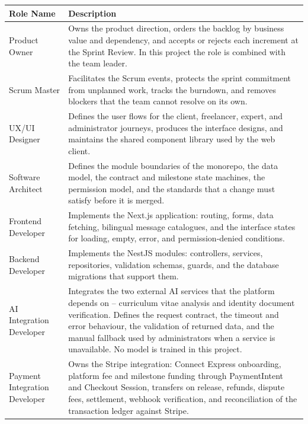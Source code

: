 \renewcommand{\arraystretch}{1.5}

\begin{table}[H]
\centering
\begin{tabular}{|p{3.8cm}|p{9.6cm}|}
\hline
\rowcolor{headerbg}
\textbf{Role Name} & \textbf{Description} \\
\hline

Product Owner &
Owns the product direction, orders the backlog by business value and dependency, and accepts or rejects each increment at the Sprint Review. In this project the role is combined with the team leader.
\\ \hline

Scrum Master &
Facilitates the Scrum events, protects the sprint commitment from unplanned work, tracks the burndown, and removes blockers that the team cannot resolve on its own.
\\ \hline

UX/UI Designer &
Defines the user flows for the client, freelancer, expert, and administrator journeys, produces the interface designs, and maintains the shared component library used by the web client.
\\ \hline

Software Architect &
Defines the module boundaries of the monorepo, the data model, the contract and milestone state machines, the permission model, and the standards that a change must satisfy before it is merged.
\\ \hline

Frontend Developer &
Implements the Next.js application: routing, forms, data fetching, bilingual message catalogues, and the interface states for loading, empty, error, and permission-denied conditions.
\\ \hline

Backend Developer &
Implements the NestJS modules: controllers, services, repositories, validation schemas, guards, and the database migrations that support them.
\\ \hline

AI Integration Developer &
Integrates the two external AI services that the platform depends on -- curriculum vitae analysis and identity document verification. Defines the request contract, the timeout and error behaviour, the validation of returned data, and the manual fallback used by administrators when a service is unavailable. No model is trained in this project.
\\ \hline

Payment Integration Developer &
Owns the Stripe integration: Connect Express onboarding, platform fee and milestone funding through PaymentIntent and Checkout Session, transfers on release, refunds, dispute fees, settlement, webhook verification, and reconciliation of the transaction ledger against Stripe.
\\ \hline


\end{tabular}
\end{table}
